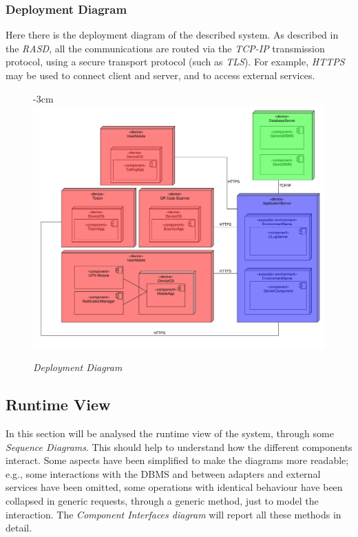 \documentclass{article}
\begin{document}
	\subsubsection{Deployment Diagram}
	Here there is the deployment diagram of the described system. As described in the \emph{RASD}, all the communications are routed via the \emph{TCP-IP} transmission protocol, using a secure transport protocol (such as \emph{TLS}). For example, \emph{HTTPS} may be used to connect client and server, and to access external services.
	
		\begin{figure}[H]
		\begin{adjustwidth} {-3cm}{}
			\centering
			\includegraphics[scale=0.45]{Component Diagrams/DeploymentDiagram.pdf}\\
		\end{adjustwidth}
		\caption{\emph{Deployment Diagram}}
	\end{figure}
	
	
	\subsection{Runtime View}
	In this section will be analysed the runtime view of the system, through some \emph{Sequence Diagrams}. This should help to understand how the different components interact. Some aspects have been simplified to make the diagrams more readable; e.g., some interactions with the DBMS and between adapters and external services have been omitted, some operations with identical behaviour have been collapsed in generic requests, through a generic method, just to model the interaction. The \emph{Component Interfaces diagram} will report all these methods in detail.
\end{document}

